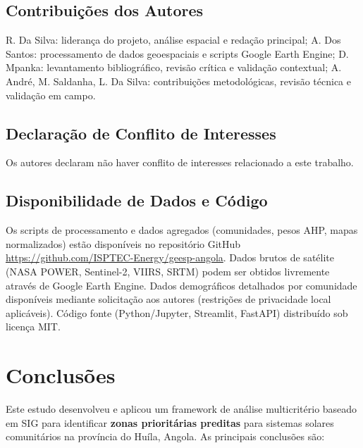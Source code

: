 \documentclass[12pt, a4paper]{article}
\begin{document}

\subsection*{Contribuições dos Autores}
\label{sec:author-contributions}
R. Da Silva: liderança do projeto, análise espacial e redação principal; A. Dos Santos: processamento de dados geoespaciais e scripts Google Earth Engine; D. Mpanka: levantamento bibliográfico, revisão crítica e validação contextual; A. André, M. Saldanha, L. Da Silva: contribuições metodológicas, revisão técnica e validação em campo.

\subsection*{Declaração de Conflito de Interesses}
\label{sec:conflicts}
Os autores declaram não haver conflito de interesses relacionado a este trabalho.

\subsection*{Disponibilidade de Dados e Código}
\label{sec:data-availability}
Os scripts de processamento e dados agregados (comunidades, pesos AHP, mapas normalizados) estão disponíveis no repositório GitHub \url{https://github.com/ISPTEC-Energy/geesp-angola}. Dados brutos de satélite (NASA POWER, Sentinel-2, VIIRS, SRTM) podem ser obtidos livremente através de Google Earth Engine. Dados demográficos detalhados por comunidade disponíveis mediante solicitação aos autores (restrições de privacidade local aplicáveis). Código fonte (Python/Jupyter, Streamlit, FastAPI) distribuído sob licença MIT.

\section{Conclusões}

Este estudo desenvolveu e aplicou um framework de análise multicritério baseado em SIG para identificar \textbf{zonas prioritárias preditas} para sistemas solares comunitários na província do Huíla, Angola. As principais conclusões são:
\end{document}
